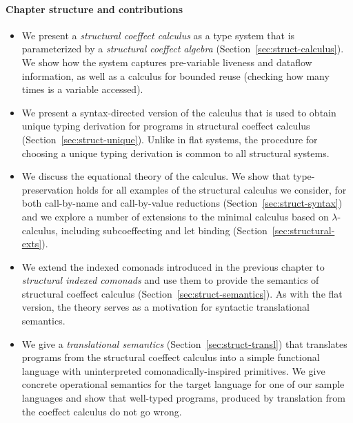 \paragraph{Chapter structure and contributions}
\begin{itemize}
\item We present a \emph{structural coeffect calculus} as a type system that is parameterized
  by a \emph{structural coeffect algebra} (Section~\ref{sec:struct-calculus}). We show how the
  system captures pre-variable liveness and dataflow information, as well as a calculus for bounded
  reuse (checking how many times is a variable accessed).

\item We present a syntax-directed version of the calculus that is used to obtain unique typing
  derivation for programs in structural coeffect calculus (Section~\ref{sec:struct-unique}).
  Unlike in flat systems, the procedure for choosing a unique typing derivation is common to all
  structural systems.

\item We discuss the equational theory of the calculus. We show that type-preservation
  holds for all examples of the structural calculus we consider, for both call-by-name and call-by-value
  reductions (Section~\ref{sec:struct-syntax}) and we
  explore a number of extensions to the minimal calculus based on $\lambda$-calculus,
  including subcoeffecting and let binding (Section~\ref{sec:structural-exts}).

\item We extend the indexed comonads introduced in the previous chapter to \emph{structural indexed
  comonads} and use them to provide the semantics of structural coeffect calculus
  (Section~\ref{sec:struct-semantics}). As with the flat version, the theory serves as a motivation
  for syntactic translational semantics.

\item We give a \emph{translational semantics} (Section~\ref{sec:struct-transl}) that translates
  programs from the structural coeffect calculus into a simple functional language with
  uninterpreted comonadically-inspired primitives. We give concrete operational semantics for the
  target language for one of our sample languages and show that well-typed programs, produced by
  translation from the coeffect calculus do not go wrong.
\end{itemize}


%
%

